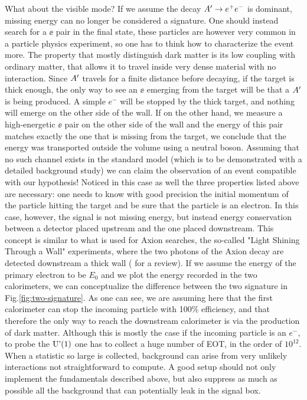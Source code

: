 What about the visible mode? If we assume the decay $A' \to e^+e^-$ is dominant, missing energy can no longer be considered a signature. One should instead search for a $\ee$ pair in the final state, these particles are however very common in a particle physics experiment, so one has to think how to characterize the event more. The property that mostly distinguish dark matter is its low coupling with ordinary matter, that allows it to travel inside very dense material with no interaction. Since $A'$ travels for a finite distance before decaying, if the target is thick enough, the only way to see an $\ee$ emerging from the target will be that a $A'$ is being produced. A simple $e^-$ will be stopped by the thick target, and nothing will emerge on the other side of the wall. If on the other hand, we measure a high-energetic $\ee$ pair on the other side of the wall and the energy of this pair matches exactly the one that is missing from the target, we conclude that the energy was transported outside the volume using a neutral boson. Assuming that no such channel exists in the standard model (which is to be demonstrated with a detailed background study) we can claim the observation of an event compatible with our hypothesis! Noticed in this case as well the three properties listed above are necessary: one needs to know with good precision the initial momentum of the particle hitting the target and be sure that the particle is an electron. In this case, however, the signal is not missing energy, but instead energy conservation between a detector placed upstream and the one placed downstream. This concept is similar to what is used for Axion searches, the so-called "Light Shining Through a Wall" experiments, where the two photons of the Axion decay are detected downstream a thick wall (\cite{Jaeckel:2010ni} for a review).
If we assume the energy of the primary electron to be $E_0$ and we plot the energy recorded in the two calorimeters, we can conceptualize the difference between the two signature in Fig.\ref{fig:two-signature}. As one can see, we are assuming here that the first calorimeter can stop the incoming particle with 100\% efficiency, and that therefore the only way to reach the downstream calorimeter is via the production of dark matter. Although this is mostly the case if the incoming particle is an $e^-$, to probe the $\textrm{U'(1)}$ one has to collect a huge number of EOT, in the order of $10^{12}$. When a statistic so large is collected, background can arise from very unlikely interactions not straightforward to compute. A good setup should not only implement the fundamentals described above, but also suppress as much as possible all the background that can potentially leak in the signal box.

